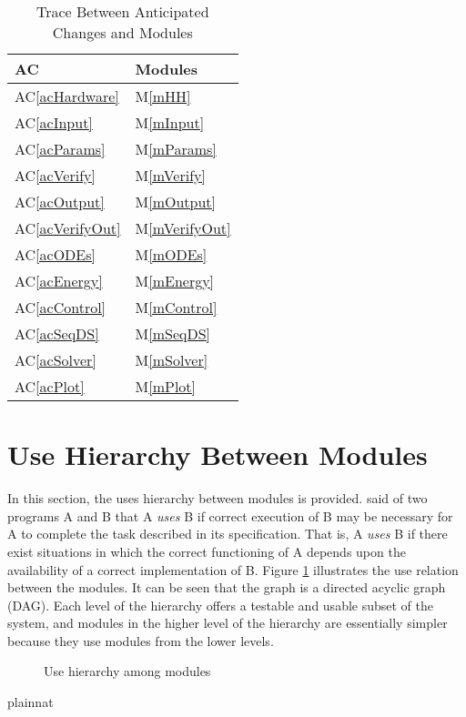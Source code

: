 \documentclass[12pt, titlepage]{article}
\newcommand{\acref}[1]{AC\ref{#1}}
\newcommand{\mref}[1]{M\ref{#1}}
\begin{document}
\begin{table}[H]
	\centering
	\begin{tabular}{p{} p{}}
		\toprule
		\textbf{AC} & \textbf{Modules}\\
		\midrule
		\acref{acHardware} & \mref{mHH}\\
		\acref{acInput} & \mref{mInput}\\
		\acref{acParams} & \mref{mParams}\\
		\acref{acVerify} & \mref{mVerify}\\
		\acref{acOutput} & \mref{mOutput}\\
		\acref{acVerifyOut} & \mref{mVerifyOut}\\
		\acref{acODEs} & \mref{mODEs}\\
		\acref{acEnergy} & \mref{mEnergy}\\
		\acref{acControl} & \mref{mControl}\\
		\acref{acSeqDS} & \mref{mSeqDS}\\
		\acref{acSolver} & \mref{mSolver}\\
		\acref{acPlot} & \mref{mPlot}\\
		\bottomrule
	\end{tabular}
	\caption{Trace Between Anticipated Changes and Modules}
	\label{TblACT}
\end{table}

\section{Use Hierarchy Between Modules} \label{SecUse}

In this section, the uses hierarchy between modules is
provided. \citet{Parnas1978} said of two programs A and B that A {\em uses} B if
correct execution of B may be necessary for A to complete the task described in
its specification. That is, A {\em uses} B if there exist situations in which
the correct functioning of A depends upon the availability of a correct
implementation of B.  Figure \ref{FigUH} illustrates the use relation between
the modules. It can be seen that the graph is a directed acyclic graph
(DAG). Each level of the hierarchy offers a testable and usable subset of the
system, and modules in the higher level of the hierarchy are essentially simpler
because they use modules from the lower levels.

\begin{figure}[H]
	\centering
	\caption{Use hierarchy among modules}
	\label{FigUH}
\end{figure}


 {plainnat}


\newpage{}
\end{document}
